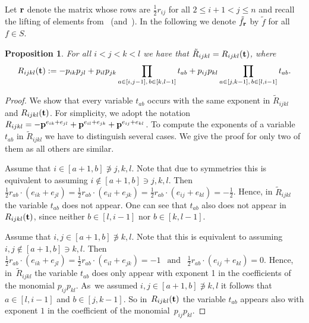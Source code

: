 \documentclass[pdftex]{sigma}%
\newtheorem{Proposition}[Theorem]{Proposition}
\numberwithin{equation}{section}
\begin{document}
Let ${\bf r}$ denote the matrix whose rows are $\frac{1}{2}r_{ij}$ for all $2\le i+1<j\le n$ and recall the lifting of elements from~ (and~).
In the following we denote $\tilde f_{\bf r}$ by $\tilde f$ for all~$f\in S$.

\begin{Proposition}
For all $i<j<k<l$ we have that $\tilde R_{ijkl}=R_{ijkl}({\bf t})$, where
\begin{displaymath}%
 R_{ijkl}({\bf t}):= -p_{ik}p_{jl} + p_{il}p_{jk}\prod_{a\in[i,j-1],\,b\in[k,l-1]} t_{ab} + p_{ij}p_{kl}\prod_{a\in[j,k-1],\,b\in[l,i-1]}t_{ab}.
\end{displaymath}
\end{Proposition}

\begin{proof}
We show that every variable $t_{ab}$ occurs with the same exponent in $\tilde R_{ijkl}$ and $R_{ijkl}({\bf t})$.
For simplicity, we adopt the notation $R_{ijkl}=-{\bf p}^{e_{ik}+e_{jl}}+{\bf p}^{e_{il}+e_{jk}} + {\bf p}^{e_{ij}+e_{kl}}$.
To compute the exponents of a variable $t_{ab}$ in $\tilde R_{ijkl}$ we have to distinguish several cases. We give the proof for only two of them as all others are similar.
\medskip

 Assume that $i\in [a+1,b]\not\ni j,k,l$. Note that due to symmetries this is equivalent to assuming $i\not \in [a+1,b]\ni j,k,l$. Then
$\frac{1}{2}r_{ab}\cdot (e_{ik}+e_{jl})=\frac{1}{2}r_{ab}\cdot (e_{il}+e_{jk})=\frac{1}{2}r_{ab}\cdot (e_{ij}+e_{kl})=-\frac{1}{2}$.
Hence, in $\tilde R_{ijkl}$ the variable $t_{ab}$ does not appear. One can see that $t_{ab}$ also does not appear in $R_{ijkl}({\bf t})$, since neither $b\in[l,i-1]$ nor $b\in[k,l-1]$.
\medskip

 Assume that $i,j\in [a+1,b]\not\ni k,l$. Note that this is equivalent to assuming $i,j\not \in [a+1,b]\ni k,l$. Then $\frac{1}{2}r_{ab}\cdot (e_{ik}+e_{jl})=\frac{1}{2}r_{ab}\cdot (e_{il}+e_{jk})=-1 \ \ \text{ and }\ \ \frac{1}{2}r_{ab}\cdot (e_{ij}+e_{kl})=0$.
Hence, in~$\tilde R_{ijkl}$ the variable $t_{ab}$ does only appear with exponent 1 in the coefficients of the monomial $p_{ij}p_{kl}$.
As~we assumed $i,j\in [a+1,b]\not\ni k,l$ it follows that $a\in [l,i-1]$ and $b\in [j,k-1]$. So in~$R_{ijkl}({\bf t})$ the variable $t_{ab}$ appears also with exponent $1$ in the coefficient of the monomial~$p_{ij}p_{kl}$.
\end{proof}
\end{document}
